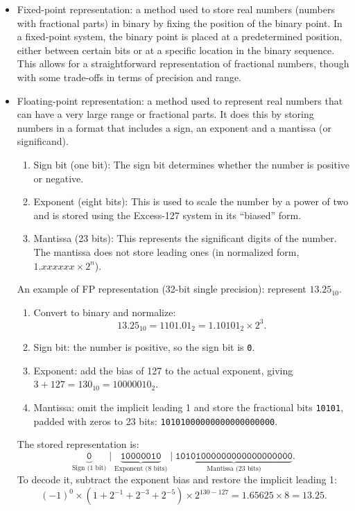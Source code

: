 \begin{itemize}
\item Fixed-point representation: a method used to store real numbers (numbers with fractional parts) in binary by fixing the position of the binary point. In a fixed-point system, the binary point is placed at a predetermined position, either between certain bits or at a specific location in the binary sequence. This allows for a straightforward representation of fractional numbers, though with some trade-offs in terms of precision and range.
\item Floating-point representation: a method used to represent real numbers that can have a very large range or fractional parts. It does this by storing numbers in a format that includes a sign, an exponent and a mantissa (or significand).
\begin{enumerate}
    \item Sign bit (one bit): The sign bit determines whether the number is positive or negative. 
    \item Exponent (eight bits): 
This is used to scale the number by a power of two and is stored using the Excess-127 system in its “biased” form.
\item Mantissa (23 bits): 
This represents the significant digits of the number. The mantissa does not store leading ones (in normalized form, $1.xxxxxx\times 2^n$). 
\end{enumerate}
An example of FP representation (32-bit single precision): represent $13.25_{10}$.
\begin{enumerate}
    \item Convert to binary and normalize:
    \[
    13.25_{10} = 1101.01_2 = 1.10101_2 \times 2^3.
    \]
    \item Sign bit: the number is positive, so the sign bit is \texttt{0}.
    \item Exponent: add the bias of 127 to the actual exponent, giving $3 + 127 = 130_{10} = 10000010_2$.
    \item Mantissa: omit the implicit leading 1 and store the fractional bits \texttt{10101}, padded with zeros to 23 bits: \texttt{10101000000000000000000}.
\end{enumerate}
The stored representation is:
\[
\underbrace{\texttt{0}}_{\text{Sign (1 bit)}}\;\vert\;
\underbrace{\texttt{10000010}}_{\text{Exponent (8 bits)}}\;\vert\;
\underbrace{\texttt{10101000000000000000000}}_{\text{Mantissa (23 bits)}}.
\]
To decode it, subtract the exponent bias and restore the implicit leading 1:
\[
(-1)^0 \times (1 + 2^{-1} + 2^{-3} + 2^{-5}) \times 2^{130-127}
= 1.65625 \times 8 = 13.25.
\]
\end{itemize}
